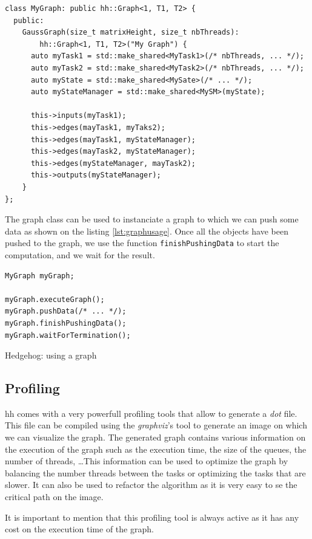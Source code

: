 \begin{listing}[ht!]
\begin{verbatim}
class MyGraph: public hh::Graph<1, T1, T2> {
  public:
    GaussGraph(size_t matrixHeight, size_t nbThreads):
        hh::Graph<1, T1, T2>("My Graph") {
      auto myTask1 = std::make_shared<MyTask1>(/* nbThreads, ... */);
      auto myTask2 = std::make_shared<MyTask2>(/* nbThreads, ... */);
      auto myState = std::make_shared<MySate>(/* ... */);
      auto myStateManager = std::make_shared<MySM>(myState);

      this->inputs(myTask1);
      this->edges(mayTask1, myTaks2);
      this->edges(mayTask1, myStateManager);
      this->edges(mayTask2, myStateManager);
      this->edges(myStateManager, mayTask2);
      this->outputs(myStateManager);
    }
};
\end{verbatim}
\label{lst:graph}
\end{listing}

The graph class can be used to instanciate a graph to which we can push some
data as shown on the listing \ref{lst:graphusage}. Once all the objects have been
pushed to the graph, we use the function \texttt{finishPushingData} to start the
computation, and we wait for the result.

\begin{listing}[ht!]
\begin{verbatim}
MyGraph myGraph;

myGraph.executeGraph();
myGraph.pushData(/* ... */);
myGraph.finishPushingData();
myGraph.waitForTermination();
\end{verbatim}
\caption{Hedgehog: using a graph}
\label{lst:graphusage}
\end{listing}

\subsection{Profiling}

\gls{hh} comes with a very powerfull profiling tools that allow to generate a
\textit{dot} file. This file can be compiled using the \textit{graphviz}'s tool
to generate an image on which we can visualize the graph. The generated graph
contains various information on the execution of the graph such as the execution
time, the size of the queues, the number of threads, \dots This information can
be used to optimize the graph by balancing the number threads between the tasks
or optimizing the tasks that are slower. It can also be used to refactor the
algorithm as it is very easy to se the critical path on the image.


It is important to mention that this profiling tool is always active as it has
any cost on the execution time of the graph.

